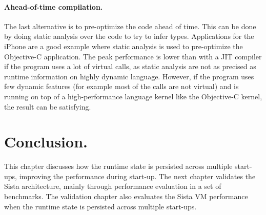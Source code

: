 \documentclass[a4paper,12pt,twoside]{../includes/ThesisStyle}
\begin{document}
\paragraph{Ahead-of-time compilation.}

The last alternative is to pre-optimize the code ahead of time. This can be done by doing static analysis over the code to try to infer types. Applications for the iPhone are a good example where static analysis is used to pre-optimize the Objective-C application. The peak performance is lower than with a JIT compiler if the program uses a lot of virtual calls, as static analysis are not as precised as runtime information on highly dynamic language. 
However, if the program uses few dynamic features (for example most of the calls are not virtual) and is running on top of a high-performance language kernel like the Objective-C kernel, the result can be satisfying.

\section{Conclusion.} This chapter discusses how the runtime state is persisted across multiple start-ups, improving the performance during start-up. The next chapter validates the Sista architecture, mainly through performance evaluation in a set of benchmarks. The validation chapter also evaluates the Sista VM performance when the runtime state is persisted across multiple start-ups.

\ifx\wholebook\relax\else
    
\end{document}
